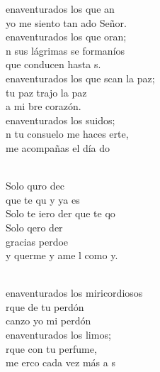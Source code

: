 \documentclass[12pt]{article}
\begin{document}
\begin{multicols*}{2}
\begin{cancion}%
	enaventurados los que an\\
	yo me siento tan ado Señor.\\
	enaventurados los que oran;\\
	n sus lágrimas se formaníos\\
	que conducen hasta s.   \\
	enaventurados los que scan la paz;\\
	tu paz trajo la paz\\
	a mi bre corazón.\\
	enaventurados los suidos;\\
	n tu consuelo me haces erte,\\
	me acompañas el día do \\\jump\\
	\begin{chorus}%
	Solo quro dec\\
	que te qu y ya es\\
	Solo te iero der que te qo\\
	Solo qero der\\
	gracias perdoe\\
	y querme y ame l como y.\\
	\end{chorus}%
	\jump\\
	enaventurados los miricordiosos\\
	rque de tu perdón \\
	canzo yo mi perdón\\
	enaventurados los limos;\\
	rque con tu perfume,\\
	me erco cada vez más a s \\

\end{cancion}
\end{multicols*}
\end{document}
